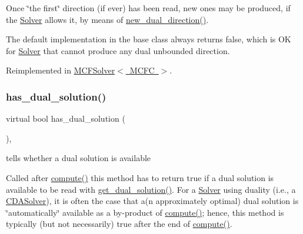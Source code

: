 Once \char`\"{}the first\char`\"{} direction (if ever) has been read, new ones may be produced, if the \mbox{\hyperlink{class_s_m_spp__di__unipi__it_1_1_solver}{Solver}} allows it, by means of \mbox{\hyperlink{class_s_m_spp__di__unipi__it_1_1_c_d_a_solver_ad83925e362d49bbe570a881791e45ea0}{new\+\_\+dual\+\_\+direction()}}.

The default implementation in the base class always returns false, which is OK for \mbox{\hyperlink{class_s_m_spp__di__unipi__it_1_1_solver}{Solver}} that cannot produce any dual unbounded direction. 

Reimplemented in \mbox{\hyperlink{class_s_m_spp__di__unipi__it_1_1_m_c_f_solver_a3a262f8106b76603f0828e41bbe5b022}{M\+C\+F\+Solver$<$ M\+C\+F\+C $>$}}.

\mbox{\label{class_s_m_spp__di__unipi__it_1_1_c_d_a_solver_a26970b0da7f4f7b56bcfc890983d9a40}} 
\subsubsection{\texorpdfstring{has\+\_\+dual\+\_\+solution()}{has\_dual\_solution()}}
{\footnotesize\ttfamily virtual bool has\+\_\+dual\+\_\+solution (\begin{DoxyParamCaption}\item[{void}]{ }\end{DoxyParamCaption})\hspace{0.3cm}{\ttfamily [inline]}, {\ttfamily [virtual]}}



tells whether a dual solution is available 

Called after \mbox{\hyperlink{class_s_m_spp__di__unipi__it_1_1_solver_a504d4e3e174c7a518cc66156a8a45ce5}{compute()}} this method has to return true if a dual solution is available to be read with \mbox{\hyperlink{class_s_m_spp__di__unipi__it_1_1_c_d_a_solver_a347d37171494bf83416a48b279b94d5a}{get\+\_\+dual\+\_\+solution()}}. For a \mbox{\hyperlink{class_s_m_spp__di__unipi__it_1_1_solver}{Solver}} using duality (i.\+e., a \mbox{\hyperlink{class_s_m_spp__di__unipi__it_1_1_c_d_a_solver}{C\+D\+A\+Solver}}), it is often the case that a(n approximately optimal) dual solution is \char`\"{}automatically\char`\"{} available as a by-\/product of \mbox{\hyperlink{class_s_m_spp__di__unipi__it_1_1_solver_a504d4e3e174c7a518cc66156a8a45ce5}{compute()}}; hence, this method is typically (but not necessarily) true after the end of \mbox{\hyperlink{class_s_m_spp__di__unipi__it_1_1_solver_a504d4e3e174c7a518cc66156a8a45ce5}{compute()}}.

